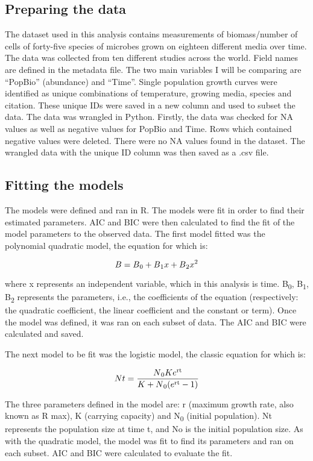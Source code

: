 \documentclass{article}
\begin{document}
\begin{flushleft}
\subsection{Preparing the data}
The dataset used in this analysis contains measurements of biomass/number of cells of forty-five species of microbes grown on eighteen different media over time. The data was collected from ten different studies across the world. Field names are defined in the metadata file. The two main variables I will be comparing are “PopBio” (abundance) and “Time”. Single population growth curves were identified as unique combinations of temperature, growing media, species and citation. These unique IDs were saved in a new column and used to subset the data. The data was wrangled in Python. Firstly, the data was checked for NA values as well as negative values for PopBio and Time. Rows which contained negative values were deleted. There were no NA values found in the dataset. The wrangled data with the unique ID column was then saved as a .csv file.
\linebreak

\subsection{Fitting the models}
The models were defined and ran in R. The models were fit in order to find their estimated parameters. AIC and BIC were then calculated to find the fit of the model parameters to the observed data. The first model fitted was the polynomial quadratic model, the equation for which is:

\[B = B\textsubscript{0}+B\textsubscript{1}x+B\textsubscript{2}x\textsuperscript{2}\]

where x represents an independent variable, which in this analysis is time. B\textsubscript{0}, B\textsubscript{1}, B\textsubscript{2} represents the parameters, i.e., the coefficients of the equation (respectively: the quadratic coefficient, the linear coefficient and the constant or term). Once the model was defined, it was ran on each subset of data. The AIC and BIC were calculated and saved.
\linebreak

The next model to be fit was the logistic model, the classic  equation for which is:

\[Nt = \frac{N\textsubscript{0} K e\textsuperscript{rt}}{K + N\textsubscript{0} (e\textsuperscript{rt} - 1)}\]

The three parameters defined in the model are: r (maximum growth rate, also known as R max), K (carrying capacity) and N\textsubscript{0} (initial population). Nt represents the population size at time t, and No is the initial population size. As with the quadratic model, the model was fit to find its parameters and ran on each subset. AIC and BIC were calculated to evaluate the fit.


\end{flushleft}
\end{document}

